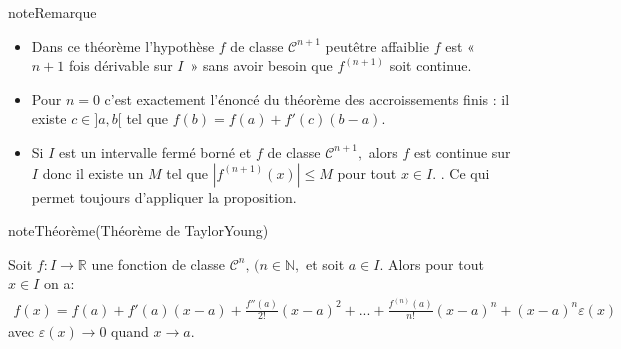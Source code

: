 \documentclass[letterpaper,10pt,french]{jupyterBook}
\begin{document}
\begin{sphinxadmonition}{note}{Remarque}
\begin{itemize}
\item {} 
\sphinxAtStartPar
Dans ce théorème l’hypothèse \(f\) de classe \(\mathscr{C}^{n+1}\)  peut\sphinxhyphen{}être affaiblie \(f\) est « \(n+1\) fois dérivable sur \(I\) » sans avoir besoin que \(f^{(n+1)}\) soit continue.

\item {} 
\sphinxAtStartPar
Pour \(n=0\) c’est exactement l’énoncé du théorème des accroissements finis : il existe \(c\in ]a,b[\) tel que \(f(b)=f(a)+f'(c)(b-a).\)

\item {} 
\sphinxAtStartPar
Si \(I\) est un intervalle fermé borné  et \(f\) de classe \(\mathscr{C}^{n+1},\) alors \(f\) est continue sur \(I\) donc il existe un \(M\) tel que \(|f^{(n+1)}(x)|\leq M\) pour tout \(x\in I.\) . Ce qui permet toujours d’appliquer la proposition.

\end{itemize}
\end{sphinxadmonition}

\begin{sphinxadmonition}{note}{Théorème(Théorème de Taylor\sphinxhyphen{}Young)}

\sphinxAtStartPar
Soit \(f : I\rightarrow\mathbb{R}\) une fonction de classe \(\mathscr{C}^{n},\,(n\in\mathbb{N},\) et soit \(a\in I.\) Alors pour tout \(x\in I\) on a:
\begin{equation*}
\begin{split}
f(x)=f(a)+f'(a)(x-a)+\frac{f''(a)}{2!}(x-a)^2+...+\frac{f^{(n)}(a)}{n!}(x-a)^n+(x-a)^n \varepsilon(x)
\end{split}
\end{equation*}
\sphinxAtStartPar
avec \(\varepsilon(x)\rightarrow0\) quand \(x\rightarrow a.\)
\end{sphinxadmonition}
\end{document}
